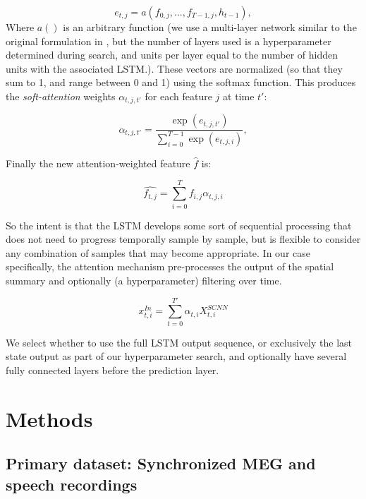 \documentclass[fleqn,10pt]{wlscirep}
\begin{document}
\begin{equation} 
  e_{t, j} = a(f_{0, j},..., f_{T-1, j}, h_{t-1}),
\end{equation}
Where $a()$ is an arbitrary function (we use a multi-layer network similar to the original formulation in \cite{Zhu}, but the number of layers used is a hyperparameter determined during search, and units per layer equal to the number of hidden units with the associated LSTM.). These vectors are normalized (so that they sum to 1, and range between 0 and 1) using the softmax function. This produces the {\em soft-attention} weights $\alpha_{t,j,t'}$ for each feature $j$ at time $t'$:

\begin{equation} \label{eq:attn_nrg}
  \alpha_{t,j,t'} =  \frac{\exp(e_{t,j,t'})}{\sum_{i=0}^{T-1}\exp(e_{t,j,i})},
\end{equation}

Finally the new attention-weighted feature $\hat{f}$ is: 

\begin{equation} \label{eq:attn}
    \hat{f_{t,j}} = \sum_{i=0}^{T} f_{i,j} \alpha_{t,j,i}
\end{equation}

So the intent is that the LSTM develops some sort of sequential processing that does not need to progress temporally sample by sample, but is flexible to consider any combination of samples that may become appropriate. In our case specifically, the attention mechanism pre-processes the output of the spatial summary and optionally (a hyperparameter) filtering over time.

\begin{equation}
  x_{t,i}^{In} = \sum_{t=0}^{T'} \alpha_{t,i} X_{t,i}^{SCNN}
\end{equation}

We select whether to use the full LSTM output sequence, or exclusively the last state output as part of our hyperparameter search, and optionally have several fully connected layers before the prediction layer.

\section*{Methods}

\subsection*{Primary dataset: Synchronized MEG and speech recordings}
\end{document}
